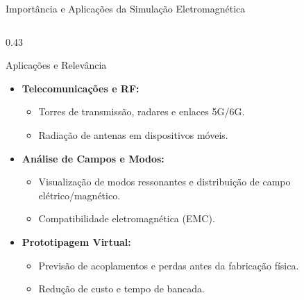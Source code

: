 \documentclass[aspectratio=169,xcolor=table]{beamer}
\begin{document}
\begin{frame}{Importância e Aplicações da Simulação Eletromagnética}
    \begin{columns}[c]
        \begin{column}{0.43\textwidth}
            \begin{block}{\footnotesize Aplicações e Relevância}
                \footnotesize
                \begin{itemize}\setlength{\itemsep}{6pt}
                    \item \textbf{Telecomunicações e RF:}
                    \begin{itemize}\scriptsize
                        \item Torres de transmissão, radares e enlaces 5G/6G.
                        \item Radiação de antenas em dispositivos móveis.
                    \end{itemize}
                    \item \textbf{Análise de Campos e Modos:}
                    \begin{itemize}\scriptsize
                        \item Visualização de modos ressonantes e distribuição de campo elétrico/magnético.
                        \item Compatibilidade eletromagnética (EMC).
                    \end{itemize}
                    \item \textbf{Prototipagem Virtual:}
                    \begin{itemize}\scriptsize
                        \item Previsão de acoplamentos e perdas antes da fabricação física.
                        \item Redução de custo e tempo de bancada.
                    \end{itemize}
                \end{itemize}
            \end{block}
        \end{column}


\end{columns}
\end{frame}
\end{document}
